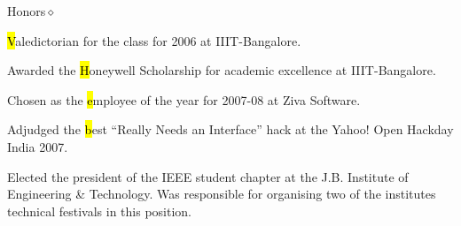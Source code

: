 \documentclass{resume}
\begin{document}
\begin{category}{Honors}{$\diamond$}

    \item {\hl Valedictorian} for the class for 2006 at IIIT-Bangalore.

    \item Awarded the {\hl Honeywell Scholarship} for academic excellence
        at IIIT-Bangalore.

    \item Chosen as the {\hl employee of the year} for 2007-08 at Ziva
        Software.

    \item Adjudged the {\hl best ``Really Needs an Interface''} hack at the
        Yahoo!  Open Hackday India 2007.

    \item Elected the president of the IEEE student chapter at the J.B. Institute
        of Engineering \& Technology. Was responsible for organising two of the
        institutes technical festivals in this position.
\end{category}
\end{document}
